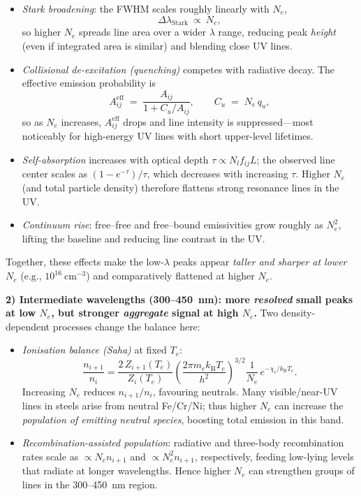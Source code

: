 \documentclass[12pt,a4paper]{article}
\begin{document}
	 \begin{itemize}
	 	\item \emph{Stark broadening}: the FWHM scales roughly linearly with \(N_e\),
	 	\[
	 	\Delta\lambda_{\mathrm{Stark}}\ \propto\ N_e,
	 	\]
	 	so higher \(N_e\) spreads line area over a wider \(\lambda\) range, reducing peak \emph{height} (even if integrated area is similar) and blending close UV lines.
	 	
	 	\item \emph{Collisional de-excitation (quenching)} competes with radiative decay. The effective emission probability is
	 	\[
	 	A_{ij}^{\mathrm{eff}} \;=\; \frac{A_{ij}}{1 + C_{u}/A_{ij}}, \qquad
	 	C_{u}\;=\;N_e\,q_{u} ,
	 	\]
	 	so as \(N_e\) increases, \(A_{ij}^{\mathrm{eff}}\) drops and line intensity is suppressed—most noticeably for high-energy UV lines with short upper-level lifetimes.
	 	
	 	\item \emph{Self-absorption} increases with optical depth \(\tau\!\propto\! N_l f_{ij} L\); the observed line center scales as \((1-e^{-\tau})/\tau\), which decreases with increasing \(\tau\). Higher \(N_e\) (and total particle density) therefore flattens strong resonance lines in the UV.
	 	
	 	\item \emph{Continuum rise}: free–free and free–bound emissivities grow roughly as \(N_e^2\), lifting the baseline and reducing line contrast in the UV.
	 \end{itemize}
	 Together, these effects make the low-\(\lambda\) peaks appear \emph{taller and sharper at lower \(N_e\)} (e.g., \(10^{16}~\mathrm{cm^{-3}}\)) and comparatively flattened at higher \(N_e\).
	 
	 \medskip
	 \textbf{2) Intermediate wavelengths (300–450~nm): more \emph{resolved} small peaks at low \(N_e\), but stronger \emph{aggregate} signal at high \(N_e\).}
	 Two density-dependent processes change the balance here:
	 
	 \begin{itemize}
	 	\item \emph{Ionisation balance (Saha)} at fixed \(T_e\):
	 	\[
	 	\frac{n_{i+1}}{n_i}
	 	=\frac{2\,Z_{i+1}(T_e)}{Z_i(T_e)}
	 	\left(\frac{2\pi m_e k_{\mathrm B} T_e}{h^2}\right)^{\!3/2}\frac{1}{N_e}\,
	 	e^{-\chi_i/k_{\mathrm B}T_e}.
	 	\]
	 	Increasing \(N_e\) reduces \(n_{i+1}/n_i\), favouring neutrals. Many visible/near-UV lines in steels arise from neutral Fe/Cr/Ni; thus higher \(N_e\) can increase the \emph{population of emitting neutral species}, boosting total emission in this band.
	 	
	 	\item \emph{Recombination-assisted population}: radiative and three-body recombination rates scale as \( \propto N_e n_{i+1}\) and \( \propto N_e^2 n_{i+1}\), respectively, feeding low-lying levels that radiate at longer wavelengths. Hence higher \(N_e\) can strengthen groups of lines in the 300–450~nm region.
	 \end{itemize}
	 
\end{document}
